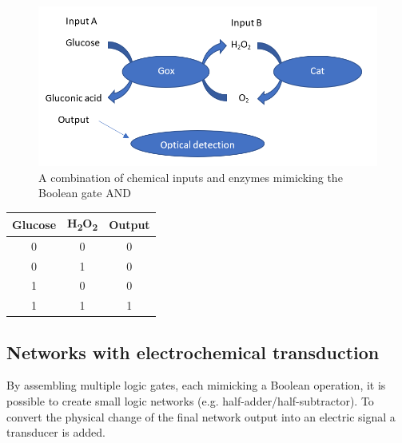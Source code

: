 \documentclass[runningheads]{llncs}
\begin{document}
		\begin{figure}[H] \centering \includegraphics[scale= 0.33]{pics/ANDneu.png} \caption{A combination of chemical inputs and enzymes mimicking the Boolean gate AND} \label{img:and} \end{figure}
		
		\begin{center}
		\begin{tabular}{c|c|c}
			Glucose & H\textsubscript{2}O\textsubscript{2} & Output\\\hline
			0 & 0 & 0\\ 
			0 & 1 & 0\\
			1 & 0 & 0\\
			1 & 1 & 1
		\end{tabular}
		\end{center}
	
\subsection{Networks with electrochemical transduction}

		By assembling multiple logic gates, each mimicking a Boolean operation, it is possible to create small logic networks (e.g. half-adder/half-subtractor). To convert the physical change of the final network output into an electric signal a transducer is added.
	
\end{document}

